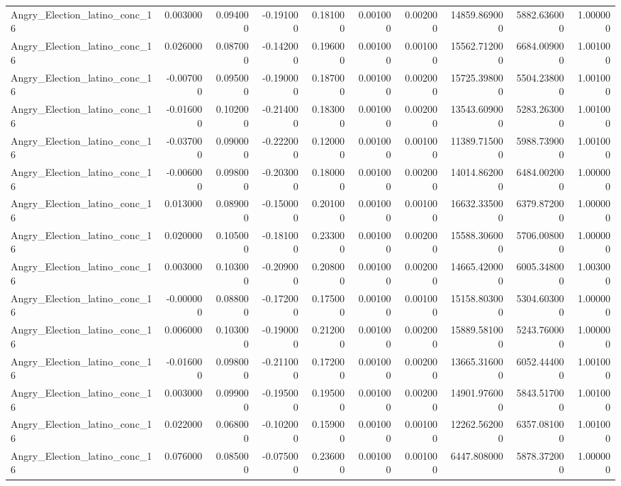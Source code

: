 \begin{table}
\begin{tabular}{lrrrrrrrrr}
Angry_Election_latino_conc_16 & 0.003000 & 0.094000 & -0.191000 & 0.181000 & 0.001000 & 0.002000 & 14859.869000 & 5882.636000 & 1.000000 \\
Angry_Election_latino_conc_16 & 0.026000 & 0.087000 & -0.142000 & 0.196000 & 0.001000 & 0.001000 & 15562.712000 & 6684.009000 & 1.001000 \\
Angry_Election_latino_conc_16 & -0.007000 & 0.095000 & -0.190000 & 0.187000 & 0.001000 & 0.002000 & 15725.398000 & 5504.238000 & 1.001000 \\
Angry_Election_latino_conc_16 & -0.016000 & 0.102000 & -0.214000 & 0.183000 & 0.001000 & 0.002000 & 13543.609000 & 5283.263000 & 1.001000 \\
Angry_Election_latino_conc_16 & -0.037000 & 0.090000 & -0.222000 & 0.120000 & 0.001000 & 0.001000 & 11389.715000 & 5988.739000 & 1.001000 \\
Angry_Election_latino_conc_16 & -0.006000 & 0.098000 & -0.203000 & 0.180000 & 0.001000 & 0.002000 & 14014.862000 & 6484.002000 & 1.000000 \\
Angry_Election_latino_conc_16 & 0.013000 & 0.089000 & -0.150000 & 0.201000 & 0.001000 & 0.001000 & 16632.335000 & 6379.872000 & 1.000000 \\
Angry_Election_latino_conc_16 & 0.020000 & 0.105000 & -0.181000 & 0.233000 & 0.001000 & 0.002000 & 15588.306000 & 5706.008000 & 1.000000 \\
Angry_Election_latino_conc_16 & 0.003000 & 0.103000 & -0.209000 & 0.208000 & 0.001000 & 0.002000 & 14665.420000 & 6005.348000 & 1.003000 \\
Angry_Election_latino_conc_16 & -0.000000 & 0.088000 & -0.172000 & 0.175000 & 0.001000 & 0.001000 & 15158.803000 & 5304.603000 & 1.000000 \\
Angry_Election_latino_conc_16 & 0.006000 & 0.103000 & -0.190000 & 0.212000 & 0.001000 & 0.002000 & 15889.581000 & 5243.760000 & 1.000000 \\
Angry_Election_latino_conc_16 & -0.016000 & 0.098000 & -0.211000 & 0.172000 & 0.001000 & 0.002000 & 13665.316000 & 6052.444000 & 1.001000 \\
Angry_Election_latino_conc_16 & 0.003000 & 0.099000 & -0.195000 & 0.195000 & 0.001000 & 0.002000 & 14901.976000 & 5843.517000 & 1.001000 \\
Angry_Election_latino_conc_16 & 0.022000 & 0.068000 & -0.102000 & 0.159000 & 0.001000 & 0.001000 & 12262.562000 & 6357.081000 & 1.001000 \\
Angry_Election_latino_conc_16 & 0.076000 & 0.085000 & -0.075000 & 0.236000 & 0.001000 & 0.001000 & 6447.808000 & 5878.372000 & 1.000000 \\

\end{tabular}
\end{table}
